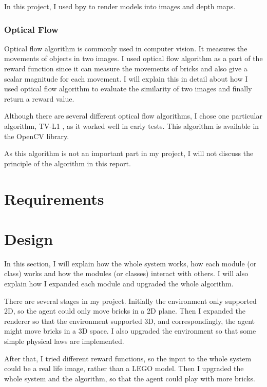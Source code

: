 \documentclass[a4paper]{article}
\begin{document}
                In this project, I used bpy to render models into images and depth maps.
            
            \subsubsection{Optical Flow}
                Optical flow algorithm is commonly used in computer vision. It measures the movements of objects in two images. I used optical flow algorithm as a part of the reward function since it can measure the movements of bricks and also give a scalar magnitude for each movement. I will explain this in detail about how I used optical flow algorithm to evaluate the similarity of two images and finally return a reward value.
                
                Although there are several different optical flow algorithms, I chose one particular algorithm, TV-L1 \cite{tvl1}, as it worked well in early tests. This algorithm is available in the OpenCV library.
                
                As this algorithm is not an important part in my project, I will not discuss the principle of the algorithm in this report.
            
    \section{Requirements}
        \newpage
    \section{Design}
    
        In this section, I will explain how the whole system works, how each module (or class) works and how the modules (or classes) interact with others. I will also explain how I expanded each module and upgraded the whole algorithm. 
        
        There are several stages in my project. 
        Initially the environment only supported 2D, so the agent could only move bricks in a 2D plane. Then I expanded the renderer so that the environment supported 3D, and correspondingly, the agent might move bricks in a 3D space. I also upgraded the environment so that some simple physical laws are implemented. 
        
        After that, I tried different reward functions, so the input to the whole system could be a real life image, rather than a LEGO model. Then I upgraded the whole system and the algorithm, so that the agent could play with more bricks.
               
\end{document}
